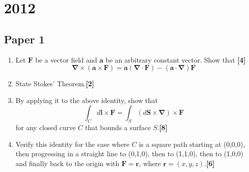 \documentclass[a4paper]{article}
\begin{document}
\begin{ans}
\begin{enumerate}[label=(\roman*)]
\end{enumerate}

\end{ans}
\newpage
\section{2012}
\subsection{Paper 1}
\begin{qns}\leavevmode
\begin{enumerate}[label=(\alph*)]
    \item Let $\mathbf{F}$ be a vector field and $\mathbf{a}$ be an arbitrary constant vector. Show that \hfill \textbf{[4]}
$$\boldsymbol{\nabla}\times(\mathbf{a}\times\mathbf{F})=\mathbf{a}(\boldsymbol{\nabla}\cdot\mathbf{F})-(\mathbf{a}\cdot\boldsymbol{\nabla})\mathbf{F}$$
\item State Stokes' Theorem.\hfill \textbf{[2]}
\item By applying it to the above identity, show that 
$$\int_C d\mathbf{l}\times\mathbf{F}=\int_S(d\mathbf{S}\times\boldsymbol{\nabla})\times\mathbf{F}$$
for any closed curve $C$ that bounds a surface $S$.\hfill \textbf{[8]}
\item Verify this identity for the case where $C$ is a square path starting at (0,0,0), then progressing in a straight line to (0,1,0), then to (1,1,0), then to (1,0,0) and finally back to the origin with $\mathbf{F}=\mathbf{r}$, where $\mathbf{r}=(x,y,z)$.\hfill \textbf{[6]}
\end{enumerate}
\end{qns}
\end{document}
